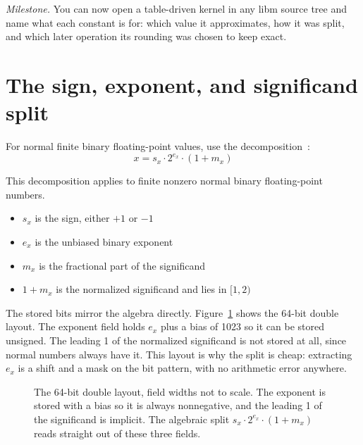 \documentclass[manuscript, nonacm]{acmart}
\begin{document}
  \emph{Milestone.}  You can now open a table-driven kernel in any libm
  source tree and name what each constant is for: which value it
  approximates, how it was split, and which later operation its rounding
  was chosen to keep exact.



  \section{The sign, exponent, and significand split}

  For normal finite binary floating-point values, use the decomposition~\cite{ieee,handbook}:
  \[ x = s_x \cdot 2^{e_x} \cdot (1 + m_x) \]

  This decomposition applies to finite nonzero normal binary floating-point
  numbers.

  \begin{itemize}
    \item $s_x$ is the sign, either $+1$ or $-1$
    \item $e_x$ is the unbiased binary exponent
    \item $m_x$ is the fractional part of the significand
    \item $1 + m_x$ is the normalized significand and lies in $[1, 2)$
  \end{itemize}

  The stored bits mirror the algebra directly. Figure~\ref{fig:doublebits}
  shows the 64-bit double layout. The exponent field holds $e_x$ plus a
  bias of 1023 so it can be stored unsigned. The leading 1 of the
  normalized significand is not stored at all, since normal numbers always
  have it. This layout is why the split is cheap: extracting $e_x$ is a
  shift and a mask on the bit pattern, with no arithmetic error anywhere.

  \begin{figure}[tbp]
    \centering
    \caption{The 64-bit double layout, field widths not to scale. The
    exponent is stored with a bias so it is always nonnegative, and the
    leading 1 of the significand is implicit. The algebraic split
      $s_x \cdot 2^{e_x} \cdot (1 + m_x)$ reads straight out of these three
      fields.}
    \label{fig:doublebits}
  \end{figure}
\end{document}
